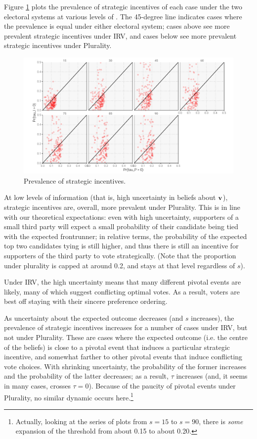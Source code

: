 \documentclass[12pt, letter]{article}
\begin{document}
Figure \ref{fig:sv_prop} plots the prevalence of strategic incentives of each case under the two electoral systems at various levels of . The 45-degree line indicates cases where the prevalence is equal under either electoral system; cases above see more prevalent strategic incentives under IRV, and cases below see more prevalent strategic incentives under Plurality.

\begin{figure}[!htb]
	\centering
	\includegraphics[width = 0.8 \textwidth]{../output/figures/cses_prop.pdf}
	\caption{Prevalence of strategic incentives.}
	\label{fig:sv_prop}
\end{figure}

At low levels of information (that is, high uncertainty in beliefs about $\bf v$), strategic incentives are, overall, more prevalent under Plurality. This is in line with our theoretical expectations: even with high uncertainty, supporters of a small third party will expect a small probability of their candidate being tied with the expected frontrunner; in relative terms, the probability of the expected top two candidates tying is still higher, and thus there is still an incentive for supporters of the third party to vote strategically. (Note that the proportion under plurality is capped at around 0.2, and stays at that level regardless of $s$).

Under IRV, the high uncertainty means that many different pivotal events are likely, many of which suggest conflicting optimal votes. As a result, voters are best off staying with their sincere preference ordering. 

As uncertainty about the expected outcome decreases (and $s$ increases), the prevalence of strategic incentives increases for a number of cases under IRV, but not under Plurality. These are cases where the expected outcome (i.e. the centre of the beliefs) is close to a pivotal event that induces a particular strategic incentive, and somewhat farther to other pivotal events that induce conflicting vote choices. With shrinking uncertainty, the probability of the former increases and the probability of the latter decreases; as a result, $\tau$ increases (and, it seems in many cases, crosses $\tau = 0$). Because of the paucity of pivotal events under Plurality, no similar dynamic occurs here.\footnote{Actually, looking at the series of plots from $s = 15$ to $s = 90$, there is \emph{some} expansion of the threshold from about 0.15 to about 0.20.}
\end{document}
